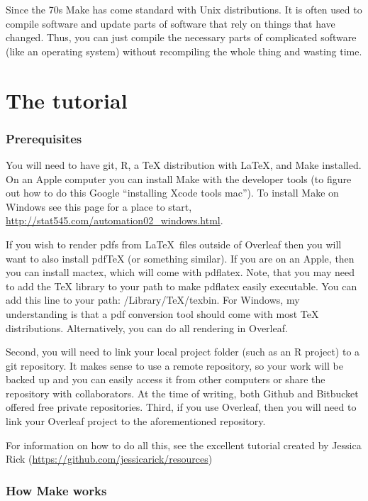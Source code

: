 \documentclass{article}
\begin{document}
Since the 70s {\sf Make} has come standard with {\sf Unix} distributions. It is often used to compile software and update parts of software that rely on things that have changed. Thus, you can just compile the necessary parts of complicated software (like an operating system) without recompiling the whole thing and wasting time.

\section{The tutorial}
\subsubsection{Prerequisites}

You will need to have {\sf git}, {\sf R}, a {\sf TeX} distribution with \LaTeX, and {\sf Make} installed. On an Apple computer you can install {\sf Make} with the developer tools (to figure out how to do this Google ``installing Xcode tools mac''). To install {\sf Make} on Windows see this page for a place to start, \url{http://stat545.com/automation02_windows.html}. 

If you wish to render pdfs from \LaTeX\ files outside of {\sf Overleaf} then you will want to also install pdfTeX (or something similar). If you are on an Apple, then you can install {\sf mactex}, which will come with {\sf pdflatex}. Note, that you may need to add the {\sf TeX} library to your path to make pdflatex easily executable. You can add this line to your path: /Library/TeX/texbin. For Windows, my understanding is that a pdf conversion tool should come with most {\sf TeX} distributions. Alternatively, you can do all rendering in {\sf Overleaf}.

Second, you will need to link your local project folder (such as an {\sf R} project) to a {\sf git} repository. It makes sense to use a remote repository, so your work will be backed up and you can easily access it from other computers or share the repository with collaborators. At the time of writing, both {\sf Github} and {\sf Bitbucket} offered free private repositories. Third, if you use {\sf Overleaf}, then you will need to link your {\sf Overleaf} project to the aforementioned repository. 

For information on how to do all this, see the excellent tutorial created by Jessica Rick (\url{https://github.com/jessicarick/resources})

\subsubsection{How {\sf Make} works}
\end{document}
